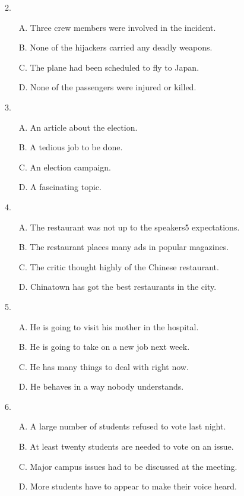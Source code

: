 \documentclass[UTF8,11pt]{ctexart}
\begin{document}
2.


\begin{itemize}[leftmargin=2em,itemsep=.2em,topsep=.4em]\item[A.] Three crew members were involved in the incident.
\item[B.] None of the hijackers carried any deadly weapons.
\item[C.] The plane had been scheduled to fly to Japan.
\item[D.] None of the passengers were injured or killed.
\end{itemize}

3.


\begin{itemize}[leftmargin=2em,itemsep=.2em,topsep=.4em]\item[A.] An article about the election.
\item[B.] A tedious job to be done.
\item[C.] An election campaign.
\item[D.] A fascinating topic.
\end{itemize}

4.


\begin{itemize}[leftmargin=2em,itemsep=.2em,topsep=.4em]\item[A.] The restaurant was not up to the speakers5 expectations.
\item[B.] The restaurant places many ads in popular magazines.
\item[C.] The critic thought highly of the Chinese restaurant.
\item[D.] Chinatown has got the best restaurants in the city.
\end{itemize}

5.


\begin{itemize}[leftmargin=2em,itemsep=.2em,topsep=.4em]\item[A.] He is going to visit his mother in the hospital.
\item[B.] He is going to take on a new job next week.
\item[C.] He has many things to deal with right now.
\item[D.] He behaves in a way nobody understands.
\end{itemize}

6.


\begin{itemize}[leftmargin=2em,itemsep=.2em,topsep=.4em]\item[A.] A large number of students refused to vote last night.
\item[B.] At least twenty students are needed to vote on an issue.
\item[C.] Major campus issues had to be discussed at the meeting.
\item[D.] More students have to appear to make their voice heard.
\end{itemize}
\end{document}
